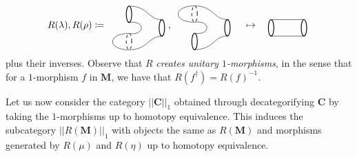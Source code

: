 \documentclass[11pt]{amsart}
\newcommand{\cat}[1]{\mathbf{#1}}
\theoremstyle{remark}
\theoremstyle{definition}
\begin{document}
%
%
%
\[
%
%
R(\lambda) , R(\rho) \coloneqq
\raisebox{-0.5\height}{%
\begin{tikzpicture}
\begin{scope}[shift={(1.2,-0.5)}]
\draw [thick]  (1.6,-0.2) ellipse (0.1 and 0.3);
\draw [thick]  (0.4,0.3) ellipse (0.1 and 0.3);
\draw [dashed] (0.4,-0.7) ellipse (0.1 and 0.3);
\draw (0.4,0) .. controls (1,0.1) and (1,-0.5) .. (0.4,-0.4);
\draw (0.4,0.6) .. controls (1.1,0.6) and (1.1,0.1) .. (1.6,0.1);
\draw (0.4,-1) .. controls (1.1,-1) and (1.1,-0.5) .. (1.6,-0.5);
\end{scope}
\begin{scope}[shift={(1.6,-1.2)}]
\draw [dashed]  (0,0) ellipse (0.1 and 0.3);
\draw (0,0.3) .. controls (-0.8,0.3) and (-0.8,-0.3) .. (0,-0.3);
\end{scope}
\end{tikzpicture}
}
%
%
%
,
%
%
\raisebox{-0.5\height}{%
\begin{tikzpicture}
\begin{scope}[shift={(1.2,-0.5)}]
\draw [thick]  (1.6,-0.2) ellipse (0.1 and 0.3);
\draw [dashed]  (0.4,0.3) ellipse (0.1 and 0.3);
\draw [thick] (0.4,-0.7) ellipse (0.1 and 0.3);
\draw (0.4,0) .. controls (1,0.1) and (1,-0.5) .. (0.4,-0.4);
\draw (0.4,0.6) .. controls (1.1,0.6) and (1.1,0.1) .. (1.6,0.1);
\draw (0.4,-1) .. controls (1.1,-1) and (1.1,-0.5) .. (1.6,-0.5);
\end{scope}
\begin{scope}[shift={(1.6,-0.2)}]
\draw [dashed]  (0,0) ellipse (0.1 and 0.3);
\draw (0,0.3) .. controls (-0.8,0.3) and (-0.8,-0.3) .. (0,-0.3);
\end{scope}
\end{tikzpicture}
}
%
%
%
\quad \mapsto \quad
%
%
\raisebox{-0.5\height}{%
\begin{tikzpicture}
\draw [thick]  (1.6,-0.2) ellipse (0.1 and 0.3);
\draw [thick] (0.4,-0.2) ellipse (0.1 and 0.3);
\draw (0.4,0.1) -- (1.6,0.1);
\draw (0.4,-0.5) -- (1.6,-0.5);
\end{tikzpicture}
}
\]
plus their inverses. Observe that $R$ \emph{creates unitary $1$-morphisms}, in the sense that for a $1$-morphism $f$ in $\cat{M}$, we have that $R(f^{\dagger}) = R(f)^{-1}$. 

Let us now consider the category $|| \cat{C} ||_1$ obtained through decategorifying $\cat{C}$ by taking the $1$-morphisms up to homotopy equivalence.  This induces the subcategory $|| R(\cat{M}) ||_1$ with objects the same as $R (\cat{M})$ and morphisms generated by $R(\mu)$ and $R(\eta)$ up to homotopy equivalence.
\end{document}
